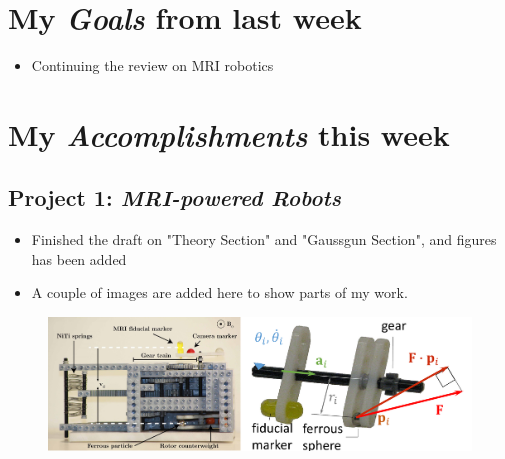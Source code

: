 \newcommand{\handoutName}{Weekly report}
\newcommand{\handoutdate}{\today}
\newcommand{\duedate}{}



\section{My \emph{Goals} from last week}
\begin{itemize}
\item Continuing the review on MRI robotics



\end{itemize}

\section{My \emph{Accomplishments} this week}

\subsection{Project 1: \emph{MRI-powered Robots}}

\begin{itemize}
\item Finished the draft on "Theory Section" and "Gaussgun Section", and figures has been added 


\item A couple of images are added here to show parts of my work.

\end{itemize}

	\begin{figure}[h]
		\begin{center}
		\includegraphics[width = \columnwidth]{fig/schematic_R}

		\vspace{1em}
		\caption{}
	\end{center}
	\end{figure}


